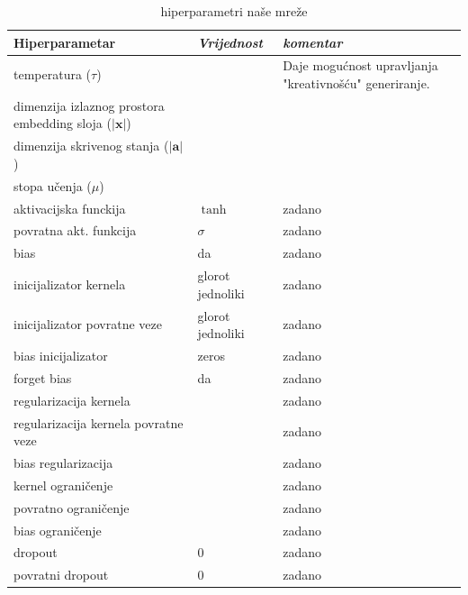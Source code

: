 \documentclass[conference]{IEEEtran}
\begin{document}
\begin{table}[htbp]
\caption{hiperparametri naše mreže}
\begin{center}
\begin{tabular}{|p{120pt}|p{40pt}|p{60pt}|}
\hline
\textbf{Hiperparametar} & \textbf{\textit{Vrijednost}} & \textbf{\textit{komentar}}\\ \hline
temperatura ($\tau$) &  & Daje mogućnost upravljanja "kreativnošću" generiranje. \\ \hline
dimenzija izlaznog prostora embedding sloja ($\lvert \mathbf{x} \rvert$) &  & \\ \hline
dimenzija skrivenog stanja ($\lvert \mathbf{a} \rvert$) &  & \\   \hline
stopa učenja ($\mu$) &  & \\ \hline \hline
aktivacijska funckija & $\tanh$ & zadano \\ \hline
povratna akt. funkcija & $\sigma$ & zadano \\ \hline
bias & da & zadano \\ \hline
inicijalizator kernela & glorot jednoliki & zadano \\ \hline
inicijalizator povratne veze & glorot jednoliki & zadano \\ \hline
bias inicijalizator & zeros & zadano \\ \hline
forget bias & da & zadano \\ \hline
regularizacija kernela & & zadano \\ \hline
regularizacija kernela povratne veze &  & zadano \\ \hline
bias regularizacija &  & zadano \\ \hline
kernel ograničenje &  & zadano \\ \hline
povratno ograničenje &  & zadano \\ \hline
bias ograničenje & & zadano\\ \hline
dropout & 0 & zadano \\ \hline
povratni dropout & 0 & zadano \\ \hline
\end{tabular}
\label{tab:hiper}
\end{center}
\end{table}
\end{document}
